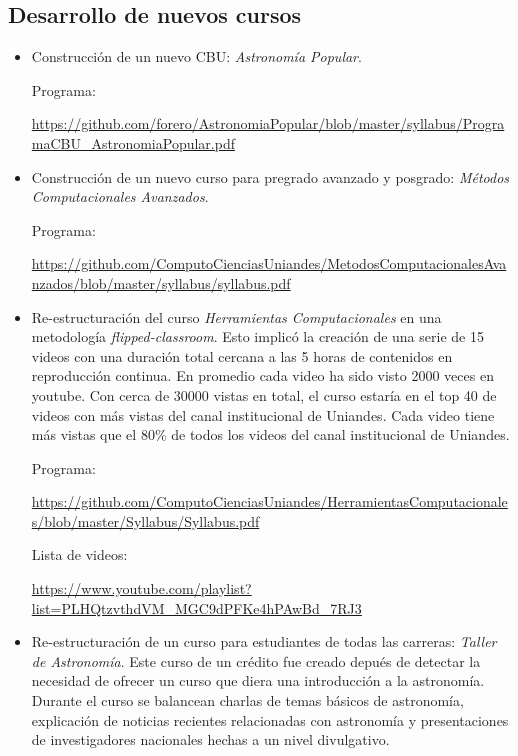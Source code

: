 \documentclass{article}
\begin{document}
\subsection{Desarrollo de nuevos cursos}
\begin{itemize}
\item Construcci\'on de un nuevo CBU: \emph{Astronom\'ia Popular}.

Programa:

\url{https://github.com/forero/AstronomiaPopular/blob/master/syllabus/ProgramaCBU_AstronomiaPopular.pdf}

\item Construcci\'on de un nuevo curso para pregrado avanzado y
  posgrado: \emph{M\'etodos Computacionales Avanzados}.

Programa:

\url{https://github.com/ComputoCienciasUniandes/MetodosComputacionalesAvanzados/blob/master/syllabus/syllabus.pdf}
\item Re-estructuraci\'on del curso \emph{Herramientas Computacionales} en
  una metodolog\'ia \emph{flipped-classroom}.
Esto implic\'o la creaci\'on de una serie de 15 videos con una
duraci\'on total cercana a las 5 horas de contenidos en reproducci\'on
continua.  
En promedio cada video ha sido visto 2000 veces en youtube.
Con cerca de 30000 vistas en total, el curso estaría en el top 40 de
videos con más vistas del canal institucional de Uniandes. 
Cada video tiene más vistas que el 80$\%$ de todos los videos del canal
institucional de Uniandes.

Programa:

\url{https://github.com/ComputoCienciasUniandes/HerramientasComputacionales/blob/master/Syllabus/Syllabus.pdf}    

Lista de videos:

\url{https://www.youtube.com/playlist?list=PLHQtzvthdVM_MGC9dPFKe4hPAwBd_7RJ3} 

\item Re-estructuraci\'on de un curso para estudiantes de todas las
  carreras: \emph{Taller de Astronom\'ia}. 
Este curso de un cr\'edito fue creado depu\'es de detectar la
necesidad de ofrecer un curso que diera una introducci\'on a la
astronom\'ia. 
Durante el curso se balancean charlas de temas b\'asicos de
astronom\'ia, explicaci\'on de noticias recientes relacionadas con
astronom\'ia y presentaciones de investigadores nacionales hechas a un
nivel divulgativo. 

\end{itemize}
\end{document}
